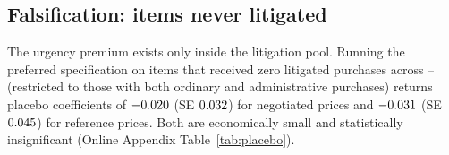 \subsection{Falsification: items never litigated}
\label{sec:placebo}

The urgency premium exists only inside the litigation pool. Running
the preferred specification on items that received zero litigated
purchases across \BPsampleStartYear--\BPsampleEndYear{} (restricted
to those with both ordinary and administrative purchases) returns
placebo coefficients of $-0.020$ (SE $0.032$)
for negotiated prices and $-0.031$
(SE $0.045$) for reference prices. Both are economically
small and statistically insignificant (Online Appendix
Table~\ref{tab:placebo}).
